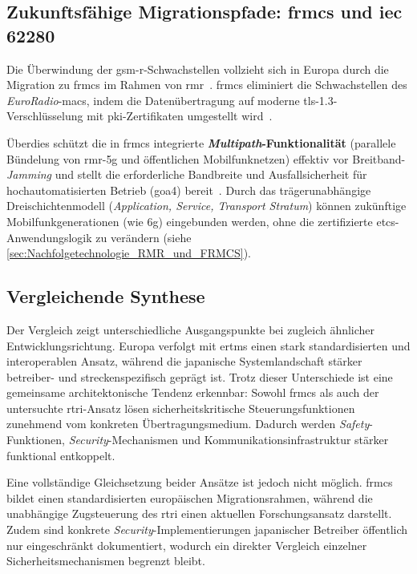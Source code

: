 \documentclass[runningheads]{res/llncs}
\begin{document}
\subsection{\texorpdfstring{Zukunftsfähige Migrationspfade: \gls{frmcs} und \gls{iec} 62280}{Zukunftsfähige Migrationspfade: FRMCS und IEC 62280}}
\label{sec:Zukunftsfähige_Migrationspfade_FRMCS_und_IEC_62280}
Die Überwindung der \gls{gsm-r}-Schwachstellen vollzieht sich in Europa durch die Migration zu \gls{frmcs} im Rahmen von \gls{rmr}~\parencite[S. 49, 123]{trinckaufETCS2024}. \gls{frmcs} eliminiert die Schwachstellen des \textit{EuroRadio}-\gls{mac}s, indem die Datenübertragung auf moderne \gls{tls}-1.3-Verschlüsselung mit \gls{pki}-Zertifikaten umgestellt wird~\parencite[S. 105, 211]{trinckaufETCS2024}. 

Überdies schützt die in \gls{frmcs} integrierte \textbf{\textit{Multipath}-Funktionalität} (parallele Bündelung von \gls{rmr}-\gls{5g} und öffentlichen Mobilfunknetzen) effektiv vor Breitband-\textit{Jamming} und stellt die erforderliche Bandbreite und Ausfallsicherheit für hochautomatisierten Betrieb (\gls{goa4}) bereit~\parencite[S. 123, 211]{trinckaufETCS2024}. Durch das trägerunabhängige Dreischichtenmodell (\textit{Application, Service, Transport Stratum}) können zukünftige Mobilfunkgenerationen (wie \gls{6g}) eingebunden werden, ohne die zertifizierte \gls{etcs}-Anwendungslogik zu verändern (siehe \autoref{sec:Nachfolgetechnologie_RMR_und_FRMCS}).

\subsection{Vergleichende Synthese}
\label{sec:Vergleichende_Synthese}

Der Vergleich zeigt unterschiedliche Ausgangspunkte bei zugleich ähnlicher Entwicklungsrichtung. Europa verfolgt mit \gls{ertms} einen stark standardisierten und interoperablen Ansatz, während die japanische Systemlandschaft stärker betreiber- und streckenspezifisch geprägt ist. Trotz dieser Unterschiede ist eine gemeinsame architektonische Tendenz erkennbar: Sowohl \gls{frmcs} als auch der untersuchte \gls{rtri}-Ansatz lösen sicherheitskritische Steuerungsfunktionen zunehmend vom konkreten Übertragungsmedium. Dadurch werden \textit{Safety}-Funktionen, \textit{Security}-Mechanismen und Kommunikationsinfrastruktur stärker funktional entkoppelt.

Eine vollständige Gleichsetzung beider Ansätze ist jedoch nicht möglich. \gls{frmcs} bildet einen standardisierten europäischen Migrationsrahmen, während die unabhängige Zugsteuerung des \gls{rtri} einen aktuellen Forschungsansatz darstellt. Zudem sind konkrete \textit{Security}-Implementierungen japanischer Betreiber öffentlich nur eingeschränkt dokumentiert, wodurch ein direkter Vergleich einzelner Sicherheitsmechanismen begrenzt bleibt.
\end{document}

